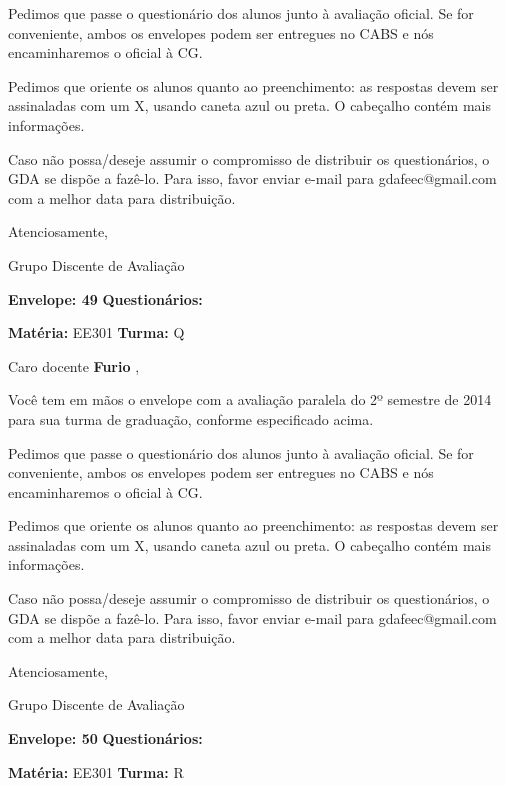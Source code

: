 \documentclass[a5paper]{letter}
\begin{document}
	Pedimos que passe o questionário dos alunos junto à avaliação oficial. Se for conveniente, ambos os envelopes podem ser entregues no CABS e nós encaminharemos o oficial à CG.

Pedimos que oriente os alunos quanto ao preenchimento: as respostas devem ser assinaladas com um X, usando caneta azul ou preta. O cabeçalho contém mais informações.

	Caso não possa/deseje assumir o compromisso de distribuir os questionários, o GDA se dispõe a fazê-lo. Para isso, favor enviar e-mail para gdafeec@gmail.com com a melhor data para distribuição.


Atenciosamente, 

Grupo Discente de Avaliação

\vspace{0.5cm}

{\bf Envelope: 49 }		\hfill	{\bf Questionários:} \hspace{2cm}

\newpage
\thispagestyle{empty}

\hfill {\bf Matéria:} EE301 {\bf Turma:} Q

Caro docente {\bf Furio }, 

	Você tem em mãos o envelope com a avaliação paralela do 2º semestre de 2014 para sua turma de graduação, conforme especificado acima.

	Pedimos que passe o questionário dos alunos junto à avaliação oficial. Se for conveniente, ambos os envelopes podem ser entregues no CABS e nós encaminharemos o oficial à CG.

Pedimos que oriente os alunos quanto ao preenchimento: as respostas devem ser assinaladas com um X, usando caneta azul ou preta. O cabeçalho contém mais informações.

	Caso não possa/deseje assumir o compromisso de distribuir os questionários, o GDA se dispõe a fazê-lo. Para isso, favor enviar e-mail para gdafeec@gmail.com com a melhor data para distribuição.


Atenciosamente, 

Grupo Discente de Avaliação

\vspace{0.5cm}

{\bf Envelope: 50 }		\hfill	{\bf Questionários:} \hspace{2cm}

\newpage
\thispagestyle{empty}

\hfill {\bf Matéria:} EE301 {\bf Turma:} R
\end{document}
